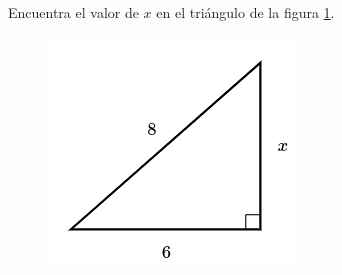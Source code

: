 Encuentra el valor de $x$ en el triángulo de la figura \ref{fig:lados_pitagoras_36}.

\begin{minipage}[t][][t]{0.35\textwidth}
    \begin{figure}[H]
        \centering
        \includegraphics[width=0.9\linewidth]{../images/lados_pitagoras_36.png}

        \caption{}
        \label{fig:lados_pitagoras_36}
    \end{figure}
\end{minipage}\hfill
